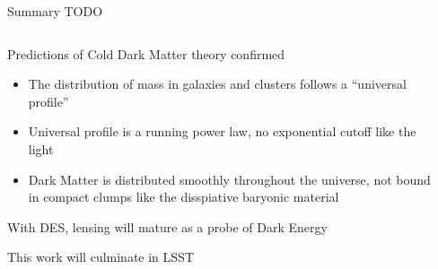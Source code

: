 \documentclass{beamer}
\begin{document}
\frame
{

    {\Huge Summary TODO}

    \begin{columns}
        \begin{column}{0.65\textwidth}
            \begin{itemize}
                    {\color{white}


                        \item Predictions of Cold Dark Matter theory confirmed
                            \begin{itemize} 

                                \item The distribution of mass in galaxies and
                                    clusters follows a ``universal profile''
                                    
                                \item Universal profile is a running power law, no
                                    exponential cutoff like the light

                                \item Dark Matter is distributed smoothly throughout
                                    the universe, not bound in compact clumps like the
                                    disspiative baryonic material
                            \end{itemize}

                        \item With DES, lensing will mature as a probe of Dark Energy

                        \item This work will culminate in LSST

                    }
            \end{itemize}
        \end{column}
        \begin{column}{0.35\textwidth}
        \end{column}
    \end{columns}
}
\end{document}
